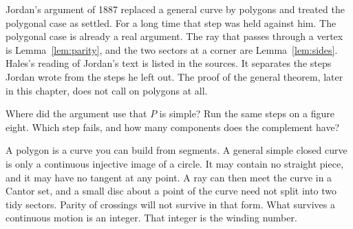 \begin{remark}\label{rem:jordangeneral}
Jordan's argument of 1887 replaced a general curve by polygons and treated the polygonal case as settled. For a long time that step was held against him. The polygonal case is already a real argument. The ray that passes through a vertex is Lemma~\ref{lem:parity}, and the two sectors at a corner are Lemma~\ref{lem:sides}. Hales's reading of Jordan's text is listed in the sources. It separates the steps Jordan wrote from the steps he left out. The proof of the general theorem, later in this chapter, does not call on polygons at all.
\end{remark}

\begin{think}
Where did the argument use that $P$ is simple? Run the same steps on a figure eight. Which step fails, and how many components does the complement have?
\end{think}

A polygon is a curve you can build from segments. A general simple closed curve is only a continuous injective image of a circle. It may contain no straight piece, and it may have no tangent at any point. A ray can then meet the curve in a Cantor set, and a small disc about a point of the curve need not split into two tidy sectors. Parity of crossings will not survive in that form. What survives a continuous motion is an integer. That integer is the winding number.
